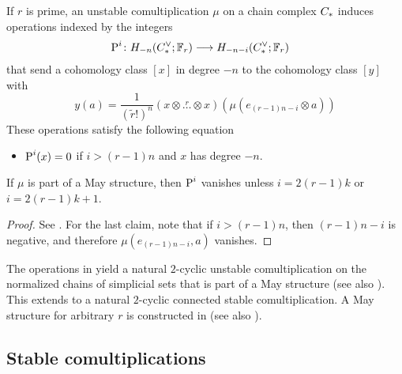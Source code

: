 \begin{proposition}\label{prop:unstable}
	If $r$ is prime, an unstable comultiplication $\mu$ on a chain complex $C_{*}$ induces operations indexed by the integers
	\begin{align*}
		\operatorname{P}^{i}\colon H_{-n}(C^\vee_{*};\mathbb{F}_r)&\longrightarrow H_{-n-i}(C^\vee_{*};\mathbb{F}_r)
	\end{align*}
	that send a cohomology class $[x]$ in degree $-n$ to the cohomology class $[y]$ with
	\[
	y(a) = \frac{1}{(\tilde{r}!)^n}(x\otimes \overset{r}{\ldots}\otimes x)(\mu(e_{(r-1)n-i}\otimes a))
	\]
	These operations satisfy the following equation
	\begin{itemize}
		\item $\operatorname{P}^i(x) = 0$ if $i>(r-1)n$ and $x$ has degree $-n$.
	\end{itemize}
\end{proposition}
\begin{remark} If $\mu$ is part of a May structure, then $\operatorname{P}^i$ vanishes unless $i = 2(r-1)k$ or $i = 2(r-1)k+1$.
\end{remark}

\begin{proof} See \cite{may1970general}.    %
	For the last claim, note that if $i>(r-1)n$, then $(r-1)n-i$ is negative, and therefore $\mu(e_{(r-1)n-i},a)$ vanishes.
\end{proof}
\begin{example}
		The operations in \cite{steenrod1947products} yield a natural $2$-cyclic unstable comultiplication on the normalized chains of simplicial sets that is part of a May structure \cite{medina2021may_st} (see also \cite{gonzalez-diaz1999steenrod, medina2021fast_sq}). This extends to a natural $2$-cyclic connected stable comultiplication. A May structure for arbitrary $r$ is constructed in \cite{medina2021may_st} (see also \cite{brumfiel2023explicit}).
\end{example}



\subsection{Stable comultiplications}\label{s:stable}

